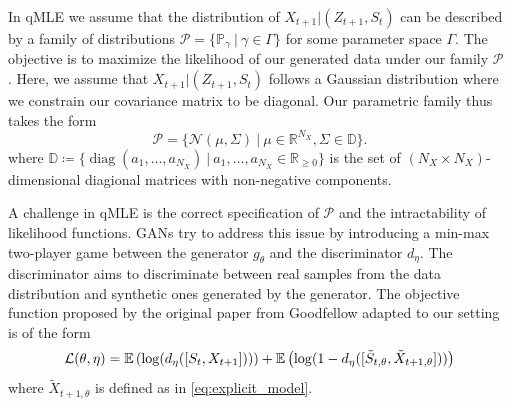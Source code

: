 \documentclass[]{article} %
\begin{document}
In qMLE we assume that the distribution of $  X_{t+1} |  (Z_{t+1}, S_{t}) $ can be described by a family of distributions $\mathcal{P} = \lbrace \mathbb{P}_\gamma \ | \ \gamma \in \Gamma \rbrace $ for some parameter space $\Gamma$. The objective is to maximize the likelihood of our generated data under our family $\mathcal{P}$ \cite[Chapter 5]{Goodfellow2016}. 
Here, we assume that $  X_{t+1} |  (Z_{t+1}, S_{t}) $ follows a Gaussian distribution where we constrain our covariance matrix to be diagonal. Our parametric family thus takes the form
\begin{equation*}
\mathcal{P} =\lbrace \mathcal{N}(\mu, \Sigma) \ | \ \mu \in \mathbb{R}^{N_X},  \Sigma \in \mathbb{D} \rbrace.
\end{equation*}
where $\mathbb{D}\coloneqq\lbrace\operatorname{diag}(a_1, \dots, a_{N_X}) \ | \ a_1, \dots, a_{N_X} \in \mathbb{R}_{\geq 0}\rbrace$ is the set of $(N_X \times N_X)$-dimensional diagional matrices with non-negative components. 

A challenge in qMLE is the correct specification of $\mathcal{P}$ and the intractability of likelihood functions. GANs try to address this issue by introducing a min-max two-player game between the generator $g_\theta$ and the discriminator $d_\eta$. The discriminator aims to discriminate between real samples from the data distribution and synthetic ones generated by the generator. The objective function proposed by the original paper from Goodfellow \cite{Goodfellow2014} adapted to our setting is of the form 
\begin{equation*}
	\mathcal{L}(\theta, \eta) = \mathbb{E}\left(\log(d_\eta([S_t, X_{t+1}]))\right) + \mathbb{E}\left(\log(1-d_\eta([\tilde S_{t, \theta}, \tilde X_{t+1,\theta}]))\right)
\end{equation*}
where $\tilde X_{t+1,\theta}$ is defined as in \eqref{eq:explicit_model}. %
\end{document}
